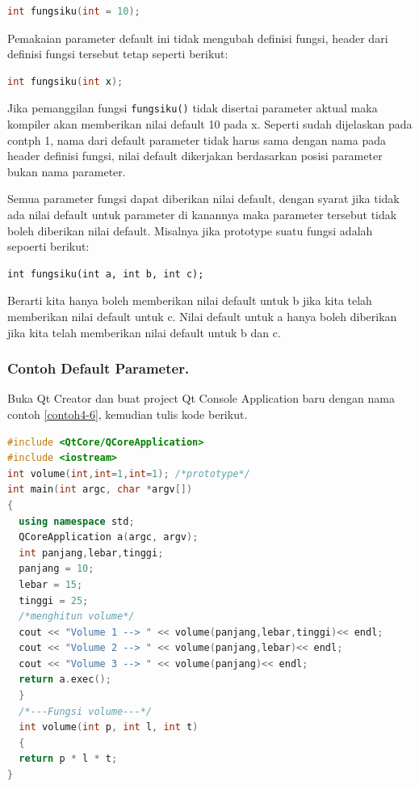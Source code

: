 \begin{lstlisting}[language=c++, numbers=none]
int fungsiku(int = 10);  
\end{lstlisting}

Pemakaian parameter default ini tidak mengubah definisi fungsi, header
dari definisi fungsi tersebut tetap seperti berikut:

\begin{lstlisting}[language=c++, numbers=none]
int fungsiku(int x);  
\end{lstlisting}

Jika pemanggilan fungsi \texttt{fungsiku()} tidak disertai parameter
aktual maka kompiler akan memberikan nilai default 10 pada x. Seperti
sudah dijelaskan pada contph 1, nama dari default parameter tidak harus
sama dengan nama pada header definisi fungsi, nilai default dikerjakan
berdasarkan posisi parameter bukan nama parameter.

Semua parameter fungsi dapat diberikan nilai default, dengan syarat jika
tidak ada nilai default untuk parameter di kanannya maka parameter
tersebut tidak boleh diberikan nilai default. Misalnya jika prototype
suatu fungsi adalah sepoerti berikut:

\begin{lstlisting}
int fungsiku(int a, int b, int c);  
\end{lstlisting}

Berarti kita hanya boleh memberikan nilai default untuk b jika kita
telah memberikan nilai default untuk c. Nilai default untuk a hanya
boleh diberikan jika kita telah memberikan nilai default untuk b dan c.

\subsubsection*{Contoh Default Parameter.}

Buka Qt Creator dan buat project Qt Console Application baru dengan nama
contoh \ref{contoh4-6}, kemudian tulis kode berikut.

\begin{lstlisting}[language=c++, caption=Default Parameter, label=contoh4-6]
#include <QtCore/QCoreApplication>
#include <iostream>
int volume(int,int=1,int=1); /*prototype*/
int main(int argc, char *argv[])
{
  using namespace std;
  QCoreApplication a(argc, argv);
  int panjang,lebar,tinggi;
  panjang = 10;
  lebar = 15;
  tinggi = 25;
  /*menghitun volume*/
  cout << "Volume 1 --> " << volume(panjang,lebar,tinggi)<< endl;
  cout << "Volume 2 --> " << volume(panjang,lebar)<< endl;
  cout << "Volume 3 --> " << volume(panjang)<< endl;
  return a.exec();
  }
  /*---Fungsi volume---*/
  int volume(int p, int l, int t)
  {
  return p * l * t;
}
   
\end{lstlisting}


